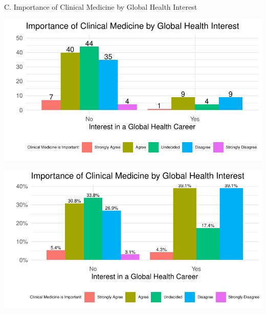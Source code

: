 \documentclass[
  letterpaper,
  DIV=11,
  numbers=noendperiod]{scrartcl}
\begin{document}
\newpage

C. Importance of Clinical Medicine by Global Health Interest

\includegraphics{GlobalHealthQuarto6-10_files/figure-pdf/unnamed-chunk-18-1.pdf}

\includegraphics{GlobalHealthQuarto6-10_files/figure-pdf/unnamed-chunk-19-1.pdf}
\end{document}
